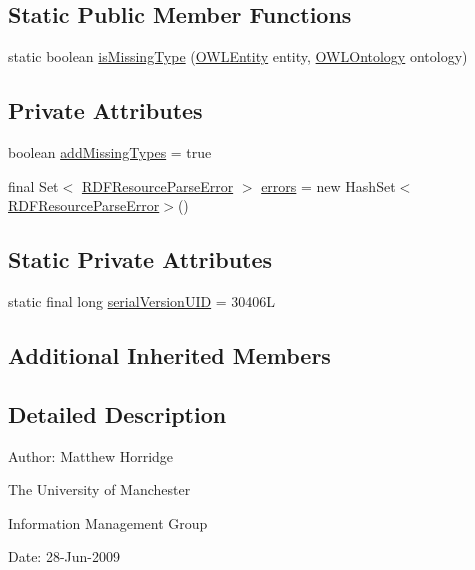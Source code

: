 \subsection*{Static Public Member Functions}
\begin{DoxyCompactItemize}
\item 
static boolean \hyperlink{classorg_1_1semanticweb_1_1owlapi_1_1io_1_1_r_d_f_ontology_format_a9d0401ddd3def6ed7906b4a6e14bc2a2}{is\-Missing\-Type} (\hyperlink{interfaceorg_1_1semanticweb_1_1owlapi_1_1model_1_1_o_w_l_entity}{O\-W\-L\-Entity} entity, \hyperlink{interfaceorg_1_1semanticweb_1_1owlapi_1_1model_1_1_o_w_l_ontology}{O\-W\-L\-Ontology} ontology)
\end{DoxyCompactItemize}
\subsection*{Private Attributes}
\begin{DoxyCompactItemize}
\item 
boolean \hyperlink{classorg_1_1semanticweb_1_1owlapi_1_1io_1_1_r_d_f_ontology_format_a82a12b94fa937ba1c8c06d548f3e35e3}{add\-Missing\-Types} = true
\item 
final Set$<$ \hyperlink{classorg_1_1semanticweb_1_1owlapi_1_1io_1_1_r_d_f_resource_parse_error}{R\-D\-F\-Resource\-Parse\-Error} $>$ \hyperlink{classorg_1_1semanticweb_1_1owlapi_1_1io_1_1_r_d_f_ontology_format_a3a44679956bf940dc9e7408adb614a6f}{errors} = new Hash\-Set$<$\hyperlink{classorg_1_1semanticweb_1_1owlapi_1_1io_1_1_r_d_f_resource_parse_error}{R\-D\-F\-Resource\-Parse\-Error}$>$()
\end{DoxyCompactItemize}
\subsection*{Static Private Attributes}
\begin{DoxyCompactItemize}
\item 
static final long \hyperlink{classorg_1_1semanticweb_1_1owlapi_1_1io_1_1_r_d_f_ontology_format_ab7f50323268f71597111f93112b9f7d7}{serial\-Version\-U\-I\-D} = 30406\-L
\end{DoxyCompactItemize}
\subsection*{Additional Inherited Members}


\subsection{Detailed Description}
Author\-: Matthew Horridge\par
 The University of Manchester\par
 Information Management Group\par
 Date\-: 28-\/\-Jun-\/2009 

